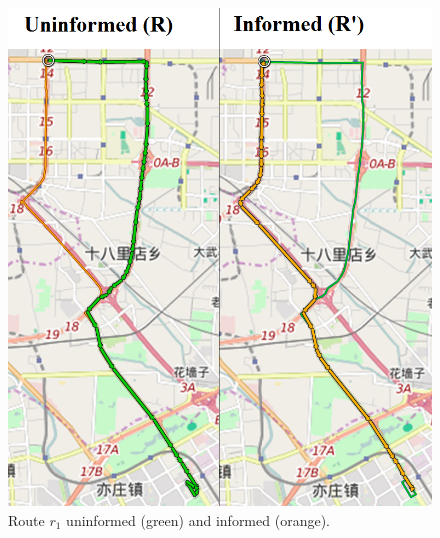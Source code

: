 \begin{figure}
	\centering
	\includegraphics[width=\textwidth]{figures/evalroute.png}
	\caption{Route $r_1$ uninformed (green) and informed (orange).}
	\label{fig:evalroute}
\end{figure}